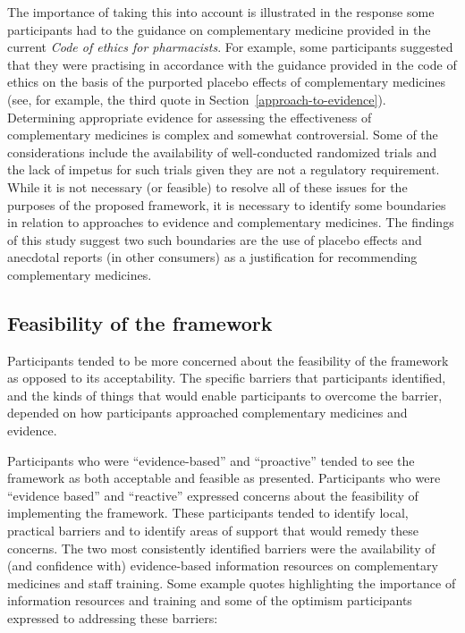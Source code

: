 \documentclass[12pt,]{article}
\begin{document}
The importance of taking this into account is illustrated in the
response some participants had to the guidance on complementary medicine
provided in the current \emph{Code of ethics for pharmacists}. For
example, some participants suggested that they were practising in
accordance with the guidance provided in the code of ethics on the basis
of the purported placebo effects of complementary medicines (see, for
example, the third quote in Section~\ref{approach-to-evidence}).
Determining appropriate evidence for assessing the effectiveness of
complementary medicines is complex and somewhat controversial. Some of
the considerations include the availability of well-conducted randomized
trials and the lack of impetus for such trials given they are not a
regulatory requirement. While it is not necessary (or feasible) to
resolve all of these issues for the purposes of the proposed framework,
it is necessary to identify some boundaries in relation to approaches to
evidence and complementary medicines. The findings of this study suggest
two such boundaries are the use of placebo effects and anecdotal reports
(in other consumers) as a justification for recommending complementary
medicines.

\subsection{Feasibility of the framework}\label{feasibility}

Participants tended to be more concerned about the feasibility of the
framework as opposed to its acceptability. The specific barriers that
participants identified, and the kinds of things that would enable
participants to overcome the barrier, depended on how participants
approached complementary medicines and evidence.

Participants who were ``evidence-based'' and ``proactive'' tended to see
the framework as both acceptable and feasible as presented. Participants
who were ``evidence based'' and ``reactive'' expressed concerns about
the feasibility of implementing the framework. These participants tended
to identify local, practical barriers and to identify areas of support
that would remedy these concerns. The two most consistently identified
barriers were the availability of (and confidence with) evidence-based
information resources on complementary medicines and staff training.
Some example quotes highlighting the importance of information resources
and training and some of the optimism participants expressed to
addressing these barriers:
\end{document}

